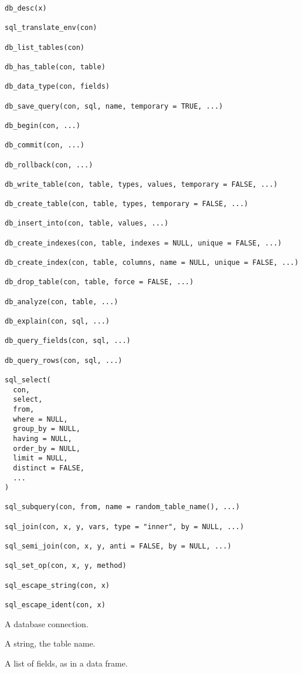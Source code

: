 \documentclass[a4paper]{book}
\begin{document}
\begin{Usage}
\begin{verbatim}
db_desc(x)

sql_translate_env(con)

db_list_tables(con)

db_has_table(con, table)

db_data_type(con, fields)

db_save_query(con, sql, name, temporary = TRUE, ...)

db_begin(con, ...)

db_commit(con, ...)

db_rollback(con, ...)

db_write_table(con, table, types, values, temporary = FALSE, ...)

db_create_table(con, table, types, temporary = FALSE, ...)

db_insert_into(con, table, values, ...)

db_create_indexes(con, table, indexes = NULL, unique = FALSE, ...)

db_create_index(con, table, columns, name = NULL, unique = FALSE, ...)

db_drop_table(con, table, force = FALSE, ...)

db_analyze(con, table, ...)

db_explain(con, sql, ...)

db_query_fields(con, sql, ...)

db_query_rows(con, sql, ...)

sql_select(
  con,
  select,
  from,
  where = NULL,
  group_by = NULL,
  having = NULL,
  order_by = NULL,
  limit = NULL,
  distinct = FALSE,
  ...
)

sql_subquery(con, from, name = random_table_name(), ...)

sql_join(con, x, y, vars, type = "inner", by = NULL, ...)

sql_semi_join(con, x, y, anti = FALSE, by = NULL, ...)

sql_set_op(con, x, y, method)

sql_escape_string(con, x)

sql_escape_ident(con, x)
\end{verbatim}
\end{Usage}
%
\begin{Arguments}
\begin{ldescription}
\item[\code{con}] A database connection.

\item[\code{table}] A string, the table name.

\item[\code{fields}] A list of fields, as in a data frame.
\end{ldescription}
\end{Arguments}
\end{document}
